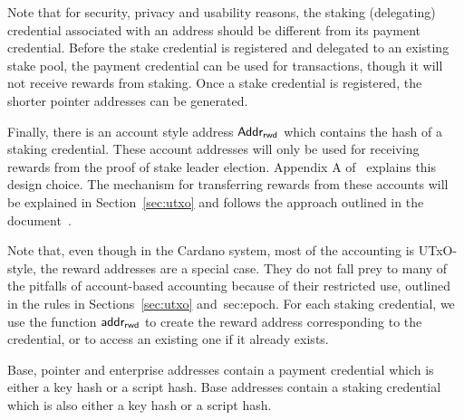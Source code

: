 Note that for security, privacy and usability reasons, the staking (delegating)
credential associated with an address should be different from its payment
credential.  Before the stake credential is registered and delegated to an
existing stake pool, the payment credential can be used for transactions, though
it will not receive rewards from staking.  Once a stake credential is
registered, the shorter pointer addresses can be generated.

Finally, there is an account style address $\mathsf{Addr_{rwd}}$ which contains the hash of
a staking credential. These account addresses will only be used for receiving
rewards from the proof of stake leader election. Appendix A
of~\cite{delegation_design} explains this design choice.  The mechanism for
transferring rewards from these accounts will be explained in
Section~\ref{sec:utxo} and follows the approach outlined in the
document~\cite{chimeric}.

Note that, even though in the Cardano system, most of the
accounting is UTxO-style, the reward addresses are a special case. They do not
fall prey to many of the pitfalls of account-based accounting because of their restricted
use, outlined in the rules in Sections~\ref{sec:utxo} and~{sec:epoch}.
For each staking credential, we use the function $\mathsf{addr_{rwd}}$ to create
the reward address corresponding to the credential, or to access an existing one
if it already exists. 

Base, pointer and enterprise addresses contain a payment credential which is
either a key hash or a script hash. Base addresses contain a staking credential
which is also either a key hash or a script hash.

